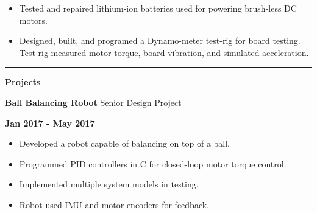 \documentclass[paper=a4,fontsize=11pt]{article} %
\def \sectionSpace      {0.3cm}     %
\def \leftColSpace      {0.1}       %
\def \middleColSpace    {0.71}      %
\def \bigMiddleColSpace {0.8}       %
\def \rightColSpace     {0.25}      %
\def \lineWidth         {20.25cm}   %
\def \lineThickness     {1pt}       %
\begin{document}
    \noindent
    \begin{minipage}[t]{\leftColSpace\linewidth}
        \hfill
    \end{minipage}
    \begin{minipage}[t]{\bigMiddleColSpace\linewidth}
        \begin{itemize}[noitemsep,topsep=0pt]
        \item Tested and repaired lithium-ion batteries used for powering brush-less DC motors. 
        \item Designed, built, and programed a Dynamo-meter test-rig for board testing. Test-rig measured motor torque, board vibration, and simulated acceleration.
        \end{itemize}
    \end{minipage}
    
    \vspace{\sectionSpace}
    \noindent\rule{\lineWidth}{\lineThickness}

    \noindent
    \begin{minipage}[t]{\leftColSpace\linewidth}
        \noindent \textbf{Projects}
    \end{minipage}
    \begin{minipage}[t]{\middleColSpace\linewidth}
        \noindent \textbf{Ball Balancing Robot } \quad Senior Design Project
    \end{minipage}
    \begin{minipage}[t]{\rightColSpace\linewidth}
        \noindent \textbf{Jan 2017 - May 2017}
    \end{minipage}

    \noindent
    \begin{minipage}[t]{\leftColSpace\linewidth}
        \hfill
    \end{minipage}
    \begin{minipage}[t]{\bigMiddleColSpace\linewidth}
        \begin{itemize}[noitemsep,topsep=0pt]
        \item Developed a robot capable of balancing on top of a ball. 
        \item Programmed PID controllers in C for closed-loop motor torque control. 
        \item Implemented multiple system models in testing. 
        \item Robot used IMU and motor encoders for feedback.
        \end{itemize}
    \end{minipage}
\end{document}
